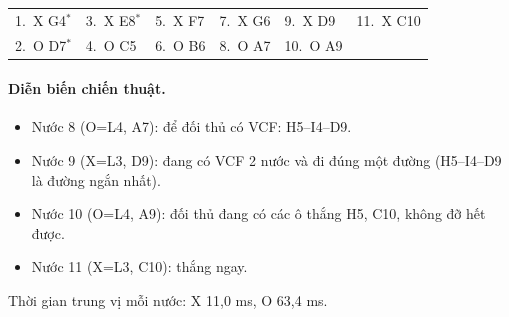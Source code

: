 {\footnotesize\linespread{1}\selectfont
\noindent\begin{tabularx}{\linewidth}{*{6}{X}}
\toprule
1.~X G4$^\ast$ & 3.~X E8$^\ast$ & 5.~X F7 & 7.~X G6 & 9.~X D9 & 11.~X C10 \\
2.~O D7$^\ast$ & 4.~O C5 & 6.~O B6 & 8.~O A7 & 10.~O A9 &  \\
\bottomrule
\end{tabularx}\par}
\paragraph{Diễn biến chiến thuật.}
\begin{itemize}\footnotesize\linespread{1.1}\selectfont
\setlength{\itemsep}{0pt}
  \item Nước 8 (O=L4, A7): để đối thủ có VCF: H5--I4--D9.
  \item Nước 9 (X=L3, D9): đang có VCF 2 nước và đi đúng một đường (H5--I4--D9 là đường ngắn nhất).
  \item Nước 10 (O=L4, A9): đối thủ đang có các ô thắng H5, C10, không đỡ hết được.
  \item Nước 11 (X=L3, C10): thắng ngay.
\end{itemize}
Thời gian trung vị mỗi nước: X 11,0 ms, O 63,4 ms.
\clearpage

